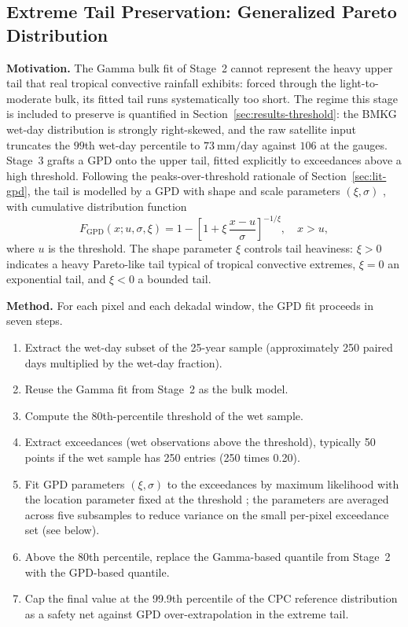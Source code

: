 \subsection{Extreme Tail Preservation: Generalized Pareto Distribution}\label{sec:methods-gpd}

\medskip\noindent\textbf{Motivation.}
The Gamma bulk fit of Stage~2 cannot represent the heavy upper
tail that real tropical convective rainfall exhibits: forced
through the light-to-moderate bulk, its fitted tail runs
systematically too short. The regime this stage is included to
preserve is quantified in Section~\ref{sec:results-threshold}: the
BMKG wet-day distribution is strongly right-skewed, and the raw
satellite input truncates the $99$th wet-day percentile to
$73~\mathrm{mm/day}$ against $106$ at the gauges. Stage~3
grafts a GPD onto the upper
tail, fitted explicitly to exceedances above a high threshold.
Following the peaks-over-threshold rationale of
Section~\ref{sec:lit-gpd}, the tail is modelled by a GPD with
shape and scale parameters $(\xi, \sigma)$ \citep{ref:coles2001},
with cumulative distribution function
\begin{equation}
F_{\text{GPD}}(x; u, \sigma, \xi) =
1 - \left[1 + \xi\,\frac{x - u}{\sigma}\right]^{-1/\xi},
\quad x > u,
\label{eq:gpd}
\end{equation}
where $u$ is the threshold. The shape parameter $\xi$ controls
tail heaviness: $\xi > 0$ indicates a heavy Pareto-like tail
typical of tropical convective extremes, $\xi = 0$ an exponential
tail, and $\xi < 0$ a bounded tail.

\medskip\noindent\textbf{Method.}
For each pixel and each dekadal window, the GPD fit proceeds in
seven steps.

\begin{enumerate}
    \item Extract the wet-day subset of the 25-year sample
    (approximately 250 paired days multiplied by the wet-day fraction).
    \item Reuse the Gamma fit from Stage~2 as the bulk model.
    \item Compute the 80th-percentile threshold of the wet
    sample.
    \item Extract exceedances (wet observations above the
    threshold), typically 50 points if the wet sample has 250
    entries (250 times 0.20).
    \item Fit GPD parameters $(\xi, \sigma)$ to the exceedances
    by maximum likelihood with the location parameter fixed at
    the threshold \citep{ref:coles2001}; the parameters are
    averaged across five subsamples to reduce variance on the
    small per-pixel exceedance set (see below).
    \item Above the 80th percentile, replace the Gamma-based
    quantile from Stage~2 with the GPD-based quantile.
    \item Cap the final value at the 99.9th percentile of the
    CPC reference distribution as a safety net against GPD
    over-extrapolation in the extreme tail.
\end{enumerate}

